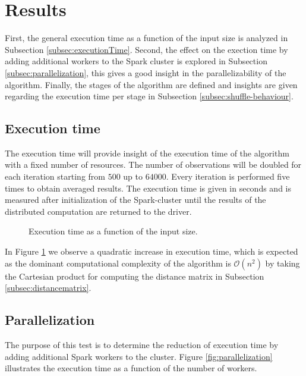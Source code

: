 \section{Results \label{sec:results}}

First, the general execution time as a function of the input size is analyzed in Subsection \ref{subsec:executionTime}. Second, the effect on the exection time by adding additional workers to the Spark cluster is explored in Subsection \ref{subsec:parallelization}, this gives a good insight in the parallelizability of the algorithm. Finally, the stages of the algorithm are defined and insights are given regarding the execution time per stage in Subsection \ref{subsec:shuffle-behaviour}.

\subsection{Execution time \label{subsec:executionTime}}

The execution time will provide insight of the execution time of the algorithm with a fixed number of resources. The number of observations will be doubled for each iteration starting from $500$ up to $64000$. Every iteration is performed five times to obtain averaged results.
The execution time is given in seconds and is measured after initialization of the Spark-cluster until the results of the distributed computation are returned to the driver.

\begin{figure}[ht!]
    \begin{center}
        
    \caption{Execution time as a function of the input size.}
    \label{fig:executiontime}
    \end{center}
\end{figure}

In Figure \ref{fig:executiontime} we observe a quadratic increase in execution time, which is expected as the dominant computational complexity of the algorithm is $\mathcal{O}(n^{2})$ by taking the Cartesian product for computing the distance matrix in Subsection \ref{subsec:distancematrix}.

\subsection{Parallelization \label{subsec:parallelization}}

The purpose of this test is to determine the reduction of execution time by adding additional Spark workers to the cluster. Figure \ref{fig:parallelization} illustrates the execution time as a function of the number of workers.

